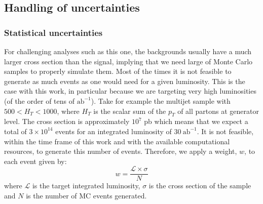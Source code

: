 \subsection{Handling of uncertainties}

\subsubsection{Statistical uncertainties}


For challenging analyses such as this one, the backgrounds usually have a much larger cross section than the signal, implying that we need large of Monte Carlo samples to properly simulate them. Most of the times it is not feasible to generate as much events as one would need for a given luminosity. This is the case with this work, in particular because we are targeting very high luminosities (of the order of tens of $\text{ab}^{-1}$). Take for example the multijet sample with $500<H_T<1000$, where $H_T$ is the scalar sum of the $p_T$ of all partons at generator level. The cross section is approximately $10^7$ pb which means that we expect a total of $3\times 10^{14}$ events for an integrated luminosity of $30~\text{ab}^{-1}$. It is not feasible, within the time frame of this work and with the available computational resources, to generate this number of events. Therefore, we apply a weight, $w$, to each event given by:	
\begin{equation}
	w=\frac{\mathcal{L}\times \sigma}{N}
\end{equation}
where $\mathcal{L}$ is the target integrated luminosity, $\sigma$ is the cross section of the sample and $N$ is the number of MC events generated.

